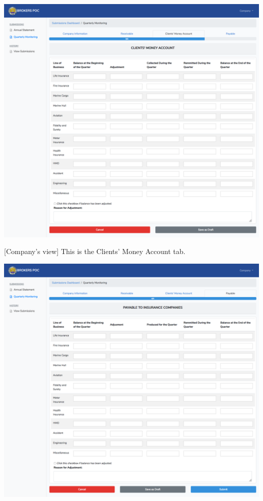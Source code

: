 \documentclass{article}
\begin{document}
\includegraphics[keepaspectratio=true]{up-ic-screens/image180}{}%

[Company’s view] This is the Clients’ Money Account
tab.%

\includegraphics[keepaspectratio=true]{up-ic-screens/image149}{}%
\end{document}
